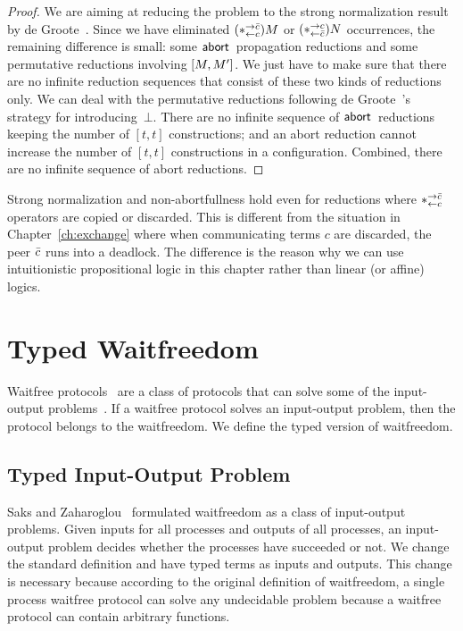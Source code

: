\begin{proof}
We are aiming at reducing the problem to the strong normalization result
by de Groote~\cite{Philippe2002js}.
Since we have eliminated $(\ast^{\rightarrow {\bar{c}}}_{\leftarrow{c}})M$ or $(\ast^{\rightarrow {c}}_{\leftarrow{\bar{c}}})N$ occurrences,
the remaining difference is small: some $\mathsf{abort\,}$ propagation reductions
 and some permutative reductions involving $[{M,M'}]$.
We just have to make sure that there are no infinite reduction sequences
that consist of these two kinds of reductions only.
We can deal with the permutative reductions following de
 Groote~\cite{Philippe2002js}'s strategy for introducing~$\bot$.
 There are no infinite sequence of $\mathsf{abort\,}$ reductions keeping the
 number of $[t,t]$ constructions; and an abort reduction cannot increase
 the number of $[t,t]$ constructions in a configuration.  Combined,
 there are no infinite sequence of abort reductions.
\end{proof}

Strong normalization and non-abortfullness hold even for reductions
where $\ast^{\rightarrow {\bar{c}}}_{\leftarrow{c}}$ operators are copied or discarded.  This is different
from the situation in Chapter~\ref{ch:exchange} where
when communicating terms $c$ are discarded, the peer $\bar{c}$ runs into a
deadlock.  The difference is the reason why we can use intuitionistic
propositional logic in this chapter rather than linear (or affine) logics.



\section{Typed Waitfreedom}
\label{waitfreedom}

Waitfree protocols~\cite{Herlihy88,Saks:1993vq} are a class of protocols
that can solve
some of the input-output problems~\cite{Moran:1987ep,Biran:1988hh}.
If a waitfree protocol solves an input-output problem, then the protocol
belongs to the waitfreedom.
We define the typed version of waitfreedom.

\subsection{Typed Input-Output Problem}

Saks and Zaharoglou~\cite{Saks:1993vq} formulated waitfreedom as a class
of input-output
problems.
Given inputs for all processes and outputs of all
processes, an input-output problem decides whether the processes have
succeeded or not.
We change the standard definition and have typed terms as inputs and
outputs.
This change is necessary because according to the original definition of
waitfreedom,
a single process waitfree protocol can solve any undecidable problem
because a waitfree protocol can contain arbitrary functions.

